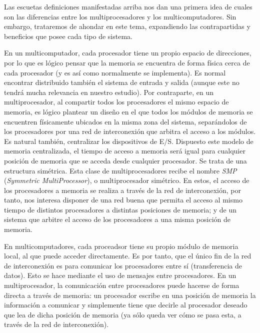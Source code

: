 Las escuetas definiciones manifestadas arriba nos dan una primera idea de cuales son las diferencias entre los multiprocesadores y los multicomputadores. Sin embargo, trataremos de ahondar en este tema, expandiendo las contrapartidas y beneficios que posee cada tipo de sistema.

En un multicomputador, cada procesador tiene un propio espacio de direcciones, por lo que es lógico pensar que la memoria se encuentra de forma física cerca de cada procesador (y es así como normalmente se implementa). Es normal encontrar distribuido también el sistema de entrada y salida (aunque este no tendrá mucha relevancia en nuestro estudio). Por contraparte, en un multiprocesador, al compartir todos los procesadores el mismo espacio de memoria, es lógico plantear un diseño en el que todos los módulos de memoria se encuentren físicamente ubicados en la misma zona del sistema, separándolos de los procesadores por una red de interconexión que arbitra el acceso a los módulos. Es natural también, centralizar los dispositivos de E/S. Dispuesto este modelo de memoria centralizada, el tiempo de acceso a memoria será igual para cualquier posición de memoria que se acceda desde cualquier procesador. Se trata de una estructura simétrica. Esta clase de multiprocesadores recibe el nombre \emph{SMP} (\emph{Symmetric MultiProcessor}), o multiprocesador simétrico. En estos, el acceso de los procesadores a memoria se realiza a través de la red de interconexión, por tanto, nos interesa disponer de una red buena que permita el acceso al mismo tiempo de distintos procesadores a distintas posiciones de memoria; y de un sistema que arbitre el acceso de los procesadores a una misma posición de memoria.

En multicomputadores, cada proceadsor tiene su propio módulo de memoria local, al que puede acceder directamente. Es por tanto, que el único fin de la red de interconexión es para comunicar los procesadores entre sí (transferencia de datos). Esto se hace mediante el uso de mensajes entre procesadores. En un multiprocesador, la comunicación entre procesadores puede hacerse de forma directa a través de memoria: un procesador escribe en una posición de memoria la información a comunicar y simplemente tiene que decirle al procesador deseado que lea de dicha posición de memoria (ya sólo queda ver cómo se pasa esta, a través de la red de interconexión).

